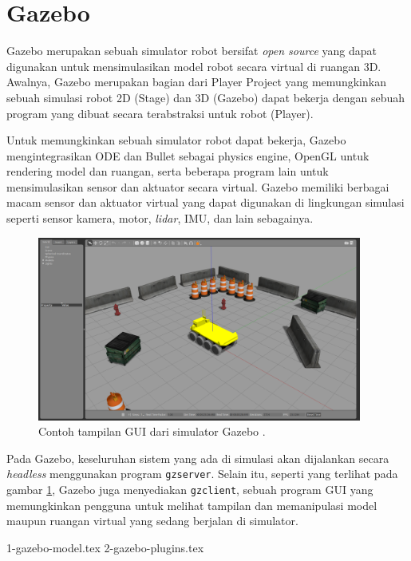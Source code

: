 \section{Gazebo}
\label{sec:gazebo}

Gazebo \citep{cit:koenig2004} merupakan sebuah simulator robot bersifat \emph{open source} yang dapat digunakan untuk mensimulasikan model robot secara virtual di ruangan 3D.
Awalnya, Gazebo merupakan bagian dari Player Project \citep{cit:gerkey2003} yang memungkinkan sebuah simulasi robot 2D (Stage) dan 3D (Gazebo) dapat bekerja dengan sebuah program yang dibuat secara terabstraksi untuk robot (Player).

Untuk memungkinkan sebuah simulator robot dapat bekerja,
  Gazebo mengintegrasikan ODE dan Bullet sebagai physics engine,
  OpenGL untuk rendering model dan ruangan,
  serta beberapa program lain untuk mensimulasikan sensor dan aktuator secara virtual.
Gazebo memiliki berbagai macam sensor dan aktuator virtual yang dapat digunakan di lingkungan simulasi seperti sensor kamera, motor, \emph{lidar}, IMU, dan lain sebagainya.

\begin{figure}[ht]
  \centering
  \includegraphics[width=0.95\textwidth,keepaspectratio]{gambar/contoh-gui-gazebo.png}
  \caption{Contoh tampilan GUI dari simulator Gazebo \citep{url:gazeboexample}.}
  \label{fig:contohguigazebo}
\end{figure}

Pada Gazebo, keseluruhan sistem yang ada di simulasi akan dijalankan secara \emph{headless} menggunakan program \lstinline{gzserver}.
Selain itu, seperti yang terlihat pada gambar \ref{fig:contohguigazebo},
  Gazebo juga menyediakan \lstinline{gzclient}, sebuah program GUI yang memungkinkan pengguna untuk melihat tampilan dan memanipulasi model maupun ruangan virtual yang sedang berjalan di simulator.

{1-gazebo-model.tex}
{2-gazebo-plugins.tex}
